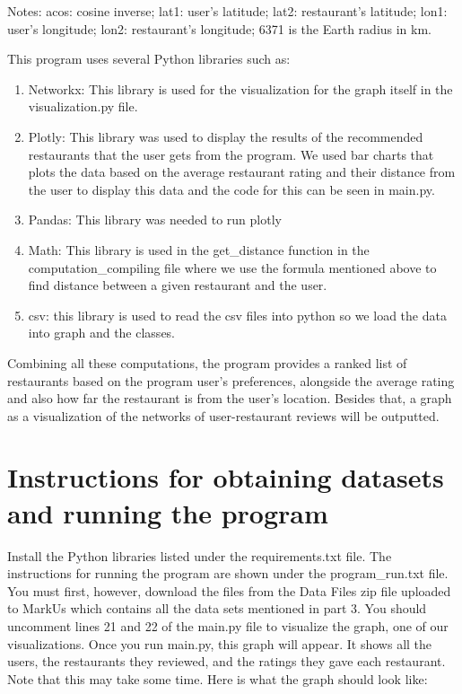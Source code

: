 \documentclass{article}
\begin{document}
Notes: acos: cosine inverse; lat1: user’s latitude; lat2: restaurant’s latitude; lon1: user’s longitude; lon2: restaurant’s longitude; 6371 is the Earth radius in km.

This program uses several Python libraries such as:
\begin{enumerate}
    \item Networkx: This library is used for the visualization for the graph itself in the visualization.py file.
    \item Plotly: This library was used to display the results of the recommended restaurants that the user gets from the program. We used bar charts that plots the data based on the average restaurant rating and their distance from the user to display this data and the code for this can be seen in main.py. 
    \item Pandas: This library was needed to run plotly
    \item Math: This library is used in the get\_distance function in the computation\_compiling file where we use the formula mentioned above to find distance between a given restaurant and the user.
    \item csv: this library is used to read the csv files into python so we load the data into graph and the classes. 
\end{enumerate}



Combining all these computations, the program provides a ranked list of restaurants based on the program user’s preferences,  alongside the average rating and also how far the restaurant is from the user’s location. Besides that, a graph as a visualization of the networks of user-restaurant reviews will be outputted.


\section{Instructions for obtaining datasets and running the program}

Install the Python libraries listed under the requirements.txt file. The instructions for running the program are shown under the program\_run.txt file. You must first, however, download the files from the Data Files zip file uploaded to MarkUs which contains all the data sets mentioned in part 3. You should uncomment lines 21 and 22 of the main.py file to visualize the graph, one of our visualizations. Once you run main.py, this graph will appear. It shows all the users, the restaurants they reviewed, and the ratings they gave each restaurant. Note that this may take some time. 
Here is what the graph should look like:
\\\\
\end{document}
